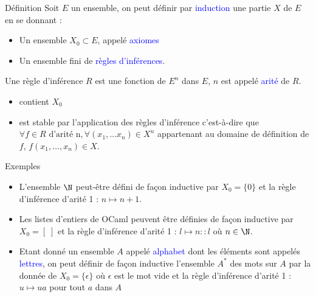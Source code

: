 \documentclass[10pt]{beamer}
\begin{document}
\begin{frame}[fragile]{\Ctitle}{\stitle}
	\begin{alertblock}{Définition}
        Soit $E$ un ensemble, on peut définir par \textcolor{blue}{induction} une partie $X$ de $E$ en se donnant :
        \begin{itemize}
            \item<2-> Un ensemble $X_0 \subset E$, appelé \textcolor{blue}{axiomes}
            \item<3-> Un ensemble fini de \textcolor{blue}{règles d'inférences}.
        \end{itemize}
        Une règle d'inférence $R$ est une fonction de $E^n$ dans $E$, $n$ est appelé \textcolor{blue}{arité} de $R$.\\
        
        \begin{itemize}
            \item<6-> contient $X_0$ 
            \item<7-> est stable par l'application des règles d'inférence c'est-à-dire que $\forall f \in R \text{ d'arité } $n$, \forall (x_1, \dots x_n) \in X^n$ appartenant au domaine de définition de $f$, $f(x_1,\dots,x_n) \in X$.
        \end{itemize}
    \end{alertblock}
\end{frame}

\begin{frame}[fragile]{\Ctitle}{\stitle}
    \begin{exampleblock}{Exemples}
        \begin{itemize}
            \item L'ensemble $\N$ peut-être défini de façon inductive par $X_0 = \{0\}$ et la règle d'inférence d'arité 1 : $n \mapsto n+1$.
            \item<2-> Les listes  d'entiers de OCaml peuvent être définies de façon inductive par $X_0 = [\;]$ et la règle d'inférence d'arité 1 : $ l \mapsto n::l$ où $n \in \N$. \\
            \item<4-> Etant donné un ensemble $A$ appelé \textcolor{blue}{alphabet} dont les éléments sont appelés \textcolor{blue}{lettres}, on peut définir de façon inductive l'ensemble $A^*$ des mots sur $A$ par la donnée de $X_0 = \{\epsilon\}$ où $\epsilon$ est le mot vide et la règle d'inférence d'arité 1 : $ u \mapsto ua$ pour tout $a$ dans $A$
        \end{itemize}
     \end{exampleblock}
\end{frame}
\end{document}
